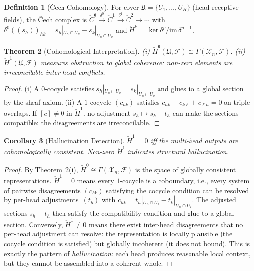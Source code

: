 \documentclass[11pt,a4paper]{article}
\theoremstyle{plain}
\newtheorem{theorem}{Theorem}[section]
\newtheorem{corollary}[theorem]{Corollary}
\theoremstyle{definition}
\newtheorem{definition}[theorem]{Definition}
\theoremstyle{remark}
\newcommand{\cF}{\mathcal{F}}
\newcommand{\cX}{\mathcal{X}}
\newcommand{\fU}{\mathfrak{U}}
\newcommand{\im}{\mathrm{im}}
\newcommand{\Cech}{\check{C}}
\newcommand{\CechH}{\check{H}}
\begin{document}
\begin{definition}[\v{C}ech Cohomology]\label{def:cech}
For cover $\fU = \{U_1,\ldots,U_H\}$ (head receptive fields), the \v{C}ech complex is $\Cech^0 \xrightarrow{\delta^0} \Cech^1 \xrightarrow{\delta^1} \Cech^2 \to \cdots$ with $\delta^0((s_h))_{hk} = s_h|_{U_h \cap U_k} - s_k|_{U_h \cap U_k}$ and $\CechH^p = \ker\delta^p/\im\,\delta^{p-1}$.
\end{definition}

\begin{theorem}[Cohomological Interpretation]\label{thm:cohom}
(i) $\CechH^0(\fU, \cF) \cong \Gamma(\cX_n, \cF)$. (ii) $\CechH^1(\fU,\cF)$ measures obstruction to global coherence: non-zero elements are irreconcilable inter-head conflicts.
\end{theorem}

\begin{proof}
(i) A $0$-cocycle satisfies $s_h|_{U_h\cap U_k} = s_k|_{U_h \cap U_k}$ and glues to a global section by the sheaf axiom. (ii) A $1$-cocycle $(c_{hk})$ satisfies $c_{hk} + c_{k\ell} + c_{\ell h} = 0$ on triple overlaps. If $[c] \neq 0$ in $\CechH^1$, no adjustment $s_h \mapsto s_h - t_h$ can make the sections compatible: the disagreements are irreconcilable.
\end{proof}

\begin{corollary}[Hallucination Detection]\label{cor:hall}
$\CechH^1 = 0$ iff the multi-head outputs are cohomologically consistent. Non-zero $\CechH^1$ indicates structural hallucination.
\end{corollary}

\begin{proof}
By Theorem~\ref{thm:cohom}(i), $\CechH^0 \cong \Gamma(\cX_n, \cF)$ is the space of globally consistent representations. $\CechH^1 = 0$ means every $1$-cocycle is a coboundary, i.e., every system of pairwise disagreements $(c_{hk})$ satisfying the cocycle condition can be resolved by per-head adjustments~$(t_h)$ with $c_{hk} = t_h|_{U_h \cap U_k} - t_k|_{U_h \cap U_k}$. The adjusted sections $s_h - t_h$ then satisfy the compatibility condition and glue to a global section. Conversely, $\CechH^1 \neq 0$ means there exist inter-head disagreements that no per-head adjustment can resolve: the representation is locally plausible (the cocycle condition is satisfied) but globally incoherent (it does not bound). This is exactly the pattern of \emph{hallucination}: each head produces reasonable local context, but they cannot be assembled into a coherent whole.
\end{proof}
\end{document}
